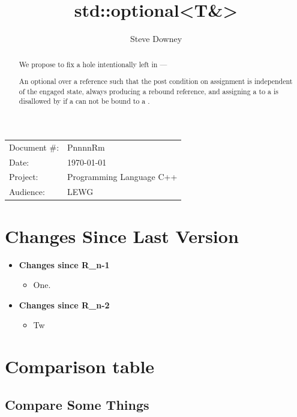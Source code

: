 \documentclass[a4paper,10pt,oneside,openany,final,article]{memoir}
\begin{document}
\title{std::optional<T\&>}
\author{Steve Downey}
\date{} %
\maketitle

\begin{flushright}
  \begin{tabular}{ll}
    Document \#: & PnnnnRm \\
    Date: & \today \\
    Project: & Programming Language C++ \\
    Audience: & LEWG
  \end{tabular}
\end{flushright}

\begin{abstract}
  We propose to fix a hole intentionally left in  ---

  An optional over a reference such that the post condition on assignment is independent of the engaged state, always producing a rebound reference, and assigning a  to a  is disallowed by  if a  can not be bound to a .
\end{abstract}

\tableofcontents*

\chapter*{Changes Since Last Version}

\begin{itemize}
\item \textbf{Changes since R_{n-1}}
  \begin{itemize}
  \item One.
  \end{itemize}
\item \textbf{Changes since R_{n-2}}
  \begin{itemize}
  \item Tw
  \end{itemize}
\end{itemize}

\chapter{Comparison table}
\section{Compare Some Things}
\end{document}
